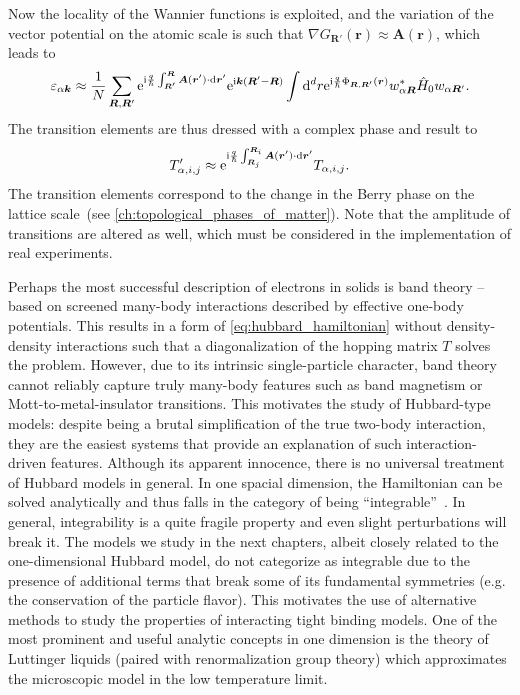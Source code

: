 Now the locality of the Wannier functions is exploited, and the variation of the vector potential on the atomic scale is such that $\nabla G_{\bm R'}(\bm r)\approx\bm A(\bm r)$, which leads to
\begin{align}
    \varepsilon_{\alpha\bm k}
    \approx
    \frac1N\sum_{\bm R,\bm R'}\mathrm e^{\mathrm i\frac q\hbar\int_{\bm R'}^{\bm R}\bm A(\bm r')\cdot\mathrm d \bm r'}\mathrm e^{\mathrm i\bm k(\bm R'-\bm R)}
    \int\mathrm d^d r
        \mathrm e^{\mathrm i\frac q\hbar\Phi_{\bm R,\bm R'}(\bm r)}
        w_{\alpha\bm R}^*
        \hat H_0
        w_{\alpha \bm R'}
    .
\end{align}
The transition elements are thus dressed with a complex phase and result to
\begin{align}
    T_{\alpha,i,j}'\approx\mathrm e^{\mathrm i\frac q\hbar\int_{\bm R_j}^{\bm R_i}\bm A(\bm r')\cdot\mathrm d\bm r'}T_{\alpha,i,j}.
\end{align}
The transition elements correspond to the change in the Berry phase on the lattice scale~(see \cref{ch:topological_phases_of_matter}).
Note that the amplitude of transitions are altered as well, which must be considered in the implementation of real experiments.

Perhaps the most successful description of electrons in solids is band theory -- based on screened many-body interactions described by effective one-body potentials.
This results in a form of \cref{eq:hubbard_hamiltonian} without density-density interactions such that a diagonalization of the hopping matrix $T$ solves the problem.
However, due to its intrinsic single-particle character, band theory cannot reliably capture truly many-body features such as band magnetism or Mott-to-metal-insulator transitions.
This motivates the study of Hubbard-type models: despite being a brutal simplification of the true two-body interaction, they are the easiest systems that provide an explanation of such interaction-driven features.
Although its apparent innocence, there is no universal treatment of Hubbard models in general.
In one spacial dimension, the Hamiltonian can be solved analytically and thus falls in the category of being ``integrable''~\cite{Essler2005}.
In general, integrability is a quite fragile property and even slight perturbations will break it.
The models we study in the next chapters, albeit closely related to the one-dimensional Hubbard model, do not categorize as integrable due to the presence of additional terms that break some of its fundamental symmetries (e.g. the conservation of the particle flavor).
This motivates the use of alternative methods to study the properties of interacting tight binding models.
One of the most prominent and useful analytic concepts in one dimension is the theory of Luttinger liquids (paired with renormalization group theory) which approximates the microscopic model in the low temperature limit.
%
%
